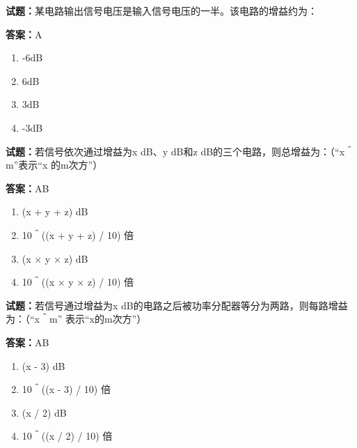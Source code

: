 \documentclass{ctexbook}
\begin{document}




\vspace{1em}

\textbf{试题：}某电路输出信号电压是输入信号电压的一半。该电路的增益约为： 

\textbf{答案：}A 

\begin{enumerate}[leftmargin=3em]
  \item -6dB 

  \item 6dB 

  \item 3dB 

  \item -3dB 

\end{enumerate}





\vspace{1em}

\textbf{试题：}若信号依次通过增益为x dB、y dB和z dB的三个电路，则总增益为：（“x＾m”表示“x
的m次方”） 

\textbf{答案：}AB 

\begin{enumerate}[leftmargin=3em]
  \item (x + y + z) dB 

  \item 10＾((x + y + z) / 10) 倍 

  \item (x × y × z) dB 

  \item 10＾((x × y × z) / 10) 倍 

\end{enumerate}





\vspace{1em}

\textbf{试题：}若信号通过增益为x dB的电路之后被功率分配器等分为两路，则每路增益为：（“x＾m”
表示“x的m次方”） 

\textbf{答案：}AB 

\begin{enumerate}[leftmargin=3em]
  \item (x - 3) dB 

  \item 10＾((x - 3) / 10) 倍 

  \item (x / 2) dB 

  \item 10＾((x / 2) / 10) 倍 

\end{enumerate}
\end{document}

